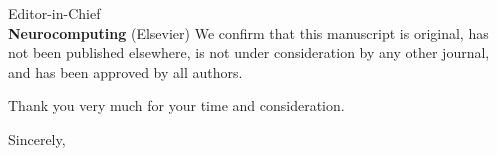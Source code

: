 \documentclass[11pt,a4paper]{letter}
\begin{document}
\begin{letter}{Editor-in-Chief\\
\textbf{Neurocomputing} (Elsevier)}
We confirm that this manuscript is original, has not been published elsewhere, is not under consideration by any other journal, and has been approved by all authors.

Thank you very much for your time and consideration.

\closing{Sincerely,}

\end{letter}
\end{document}
